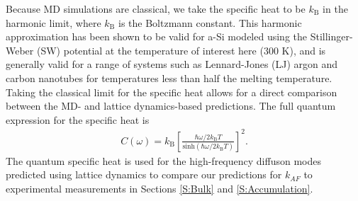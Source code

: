 \documentclass[aps,prb,twocolumn,superscriptaddress,footinbib,amsmath,amssymb,floatfix]{revtex4}
\begin{document}
Because MD simulations are classical,\cite{mcquarrie_statistical_2000} 
we take the specific heat to be $k_{\text{B}}$ in the 
harmonic limit, where $k_{\text{B}}$ is the Boltzmann constant. 
This harmonic approximation has been shown to be valid 
for a-Si modeled using the Stillinger-Weber (SW) potential at the temperature 
of interest here (300 K),\cite{feldman_thermal_1993} and is generally 
valid for a range of systems such as 
Lennard-Jones (LJ) argon\cite{mcgaughey_quantitative_2004} 
and carbon nanotubes\cite{larkin_comparison_2012} for temperatures less 
than half the melting temperature. 
Taking the classical limit for the specific heat allows for a direct 
comparison between the MD- and lattice dynamics-based 
predictions. 
The full quantum expression for the specific heat is
\cite{ziman_electrons_2001}
\begin{equation}\label{EQ:Cquantum}
\begin{split}
C(\omega) = k_{\text{B}}\left[\frac{\hbar\omega/2k_{\text{B}}T}
{\text{sinh}(\hbar\omega/2k_{\text{B}}T)}\right]^2.
\end{split}
\end{equation} 
The quantum specific heat is used for the high-frequency 
diffuson modes 
predicted using lattice dynamics to compare our predictions 
for $k_{AF}$ to experimental measurements in Sections 
\ref{S:Bulk} and \ref{S:Accumulation}. 
\end{document}
